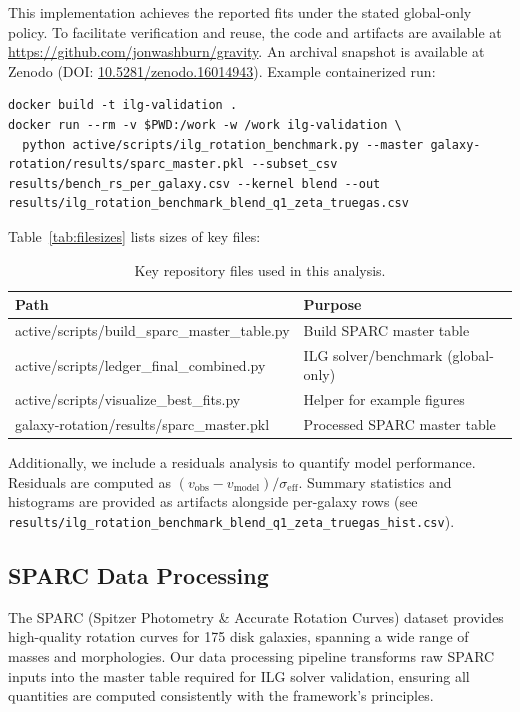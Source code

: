 \documentclass[12pt,a4paper]{article}
\begin{document}
This implementation achieves the reported fits under the stated global-only policy. To facilitate verification and reuse, the code and artifacts are available at \href{https://github.com/jonwashburn/gravity}{https://github.com/jonwashburn/gravity}. An archival snapshot is available at Zenodo (DOI: \href{https://doi.org/10.5281/zenodo.16014943}{10.5281/zenodo.16014943}). Example containerized run:

\begin{verbatim}
docker build -t ilg-validation .
docker run --rm -v $PWD:/work -w /work ilg-validation \
  python active/scripts/ilg_rotation_benchmark.py --master galaxy-rotation/results/sparc_master.pkl --subset_csv results/bench_rs_per_galaxy.csv --kernel blend --out results/ilg_rotation_benchmark_blend_q1_zeta_truegas.csv
\end{verbatim}
Table~\ref{tab:filesizes} lists sizes of key files:

\begin{table}[h]
\centering
\caption{Key repository files used in this analysis.}
\label{tab:files}
\begin{tabular}{l l}
\toprule
Path & Purpose \\
\midrule
active/scripts/build\_sparc\_master\_table.py & Build SPARC master table \\
active/scripts/ledger\_final\_combined.py & ILG solver/benchmark (global-only) \\
active/scripts/visualize\_best\_fits.py & Helper for example figures \\
galaxy-rotation/results/sparc\_master.pkl & Processed SPARC master table \\
\bottomrule
\end{tabular}
\end{table}

Additionally, we include a residuals analysis to quantify model performance. Residuals are computed as $(v_\mathrm{obs} - v_\mathrm{model}) / \sigma_\mathrm{eff}$. Summary statistics and histograms are provided as artifacts alongside per-galaxy rows (see \texttt{results/ilg\_rotation\_benchmark\_blend\_q1\_zeta\_truegas\_hist.csv}).

\subsection{SPARC Data Processing}

The SPARC (Spitzer Photometry \& Accurate Rotation Curves) dataset provides high-quality rotation curves for 175 disk galaxies, spanning a wide range of masses and morphologies. Our data processing pipeline transforms raw SPARC inputs into the master table required for ILG solver validation, ensuring all quantities are computed consistently with the framework's principles.
\end{document}
